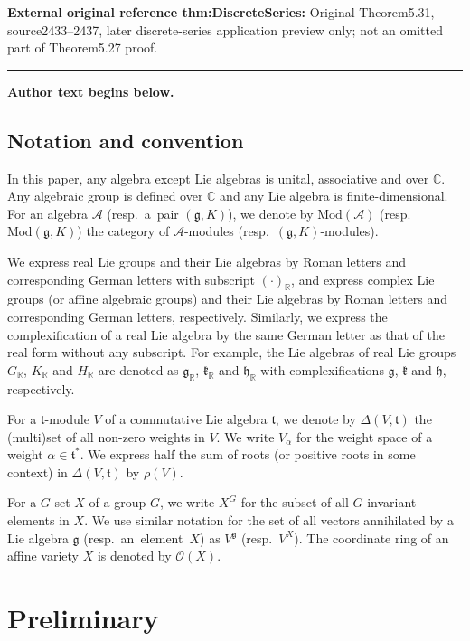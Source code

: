 \documentclass[11pt]{article}
\numberwithin{equation}{section}
\numberwithin{equation}{section}
\theoremstyle{definition}
\newcommand{\BasicRing}[1]{\mathbb{#1}}
\newcommand{\RR}{\BasicRing{R}}
\newcommand{\CC}{\BasicRing{C}}
\newcommand{\Mod}{\mathrm{Mod}}
\newcommand{\alg}[1]{\mathcal{#1}}
\newcommand{\lie}[1]{\mathfrak{#1}}
\newcommand{\regular}{\mathcal{O}}
\newcommand{\rring}[1]{\regular(#1)}
\newcommand{\rhog}[1]{\rho(#1)}
\begin{document}
\noindent\textbf{External original reference thm:DiscreteSeries:} Original Theorem5.31, source2433–2437, later discrete-series application preview only; not an omitted part of Theorem5.27 proof.\par
\medskip\hrule\medskip\noindent\textbf{Author text begins below.}\par
\setcounter{section}{1}
\subsection*{Notation and convention}

In this paper, any algebra except Lie algebras is unital, associative and over $\CC$.
Any algebraic group is defined over $\CC$ and any Lie algebra is finite-dimensional.
For an algebra $\alg{A}$ (resp.\ a~pair $(\lie{g}, K)$), we denote by $\Mod(\alg{A})$ (resp.\ $\Mod(\lie{g}, K)$) the category of $\alg{A}$-modules (resp.\ \mbox{$(\lie{g}, K)$-modules}).

We express real Lie groups and their Lie algebras by Roman letters and corresponding German letters with subscript $(\cdot)_\RR$, and express complex Lie groups (or affine algebraic groups) and their Lie algebras by Roman letters and corresponding German letters, respectively.
Similarly, we express the complexification of a real Lie algebra by the same German letter as that of the real form without any subscript.
For example, the Lie algebras of real Lie groups $G_\RR$, $K_\RR$ and $H_\RR$ are denoted as $\lie{g}_\RR$, $\lie{k}_\RR$ and $\lie{h}_\RR$ with complexifications $\lie{g}$, $\lie{k}$ and $\lie{h}$, respectively.

For a $\lie{t}$-module $V$ of a commutative Lie algebra $\lie{t}$, we denote by $\Delta(V, \lie{t})$ the (multi)set of all non-zero weights in $V$.
We write $V_\alpha$ for the weight space of a weight $\alpha \in \lie{t}^*$.
We express half the sum of roots (or positive roots in some context) in $\Delta(V, \lie{t})$ by $\rhog{V}$.

For a $G$-set $X$ of a group $G$, we write $X^G$ for the subset of all $G$-invariant elements in $X$.
We use similar notation for the set of all vectors annihilated by a Lie algebra $\lie{g}$ (resp.\ an~element~$X$) as $V^{\lie{g}}$ \big(resp.\ $V^X$\big).
The coordinate ring of an affine variety $X$ is denoted by $\rring{X}$.


\section{Preliminary}
\end{document}

